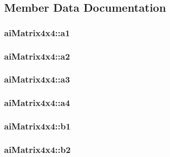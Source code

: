 \subsection{Member Data Documentation}
\hypertarget{structai_matrix4x4_aeabb269b7ef332d3c69c14d8af3d531c}{
\subsubsection[{a1}]{ ai\-Matrix4x4\-::a1}}\label{structai_matrix4x4_aeabb269b7ef332d3c69c14d8af3d531c}
\hypertarget{structai_matrix4x4_a9d36d992ba3cfc814913e0225a04b91b}{
\subsubsection[{a2}]{ ai\-Matrix4x4\-::a2}}\label{structai_matrix4x4_a9d36d992ba3cfc814913e0225a04b91b}
\hypertarget{structai_matrix4x4_a36f0d69cf678c3b5deea5a76f5624848}{
\subsubsection[{a3}]{ ai\-Matrix4x4\-::a3}}\label{structai_matrix4x4_a36f0d69cf678c3b5deea5a76f5624848}
\hypertarget{structai_matrix4x4_a184e1a78f61c430aa7b0079b42e4c2a0}{
\subsubsection[{a4}]{ ai\-Matrix4x4\-::a4}}\label{structai_matrix4x4_a184e1a78f61c430aa7b0079b42e4c2a0}
\hypertarget{structai_matrix4x4_a59667637f4d71bf4ebc1183bebe746fb}{
\subsubsection[{b1}]{ ai\-Matrix4x4\-::b1}}\label{structai_matrix4x4_a59667637f4d71bf4ebc1183bebe746fb}
\hypertarget{structai_matrix4x4_af5dcecf706021b313239b7113cb80daa}{
\subsubsection[{b2}]{ ai\-Matrix4x4\-::b2}}\label{structai_matrix4x4_af5dcecf706021b313239b7113cb80daa}
